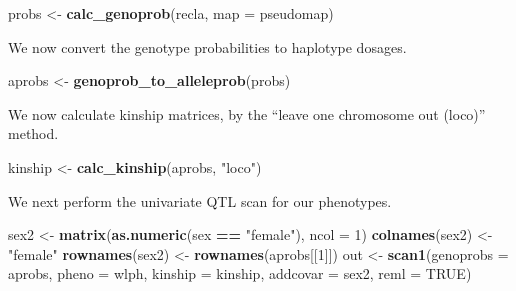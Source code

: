 \documentclass[oneside]{book}
\newenvironment{Shaded}{\begin{snugshade}}{\end{snugshade}}
\newcommand{\CommentTok}[1]{\textcolor[rgb]{0.56,0.35,0.01}{\textit{#1}}}
\newcommand{\DataTypeTok}[1]{\textcolor[rgb]{0.13,0.29,0.53}{#1}}
\newcommand{\DecValTok}[1]{\textcolor[rgb]{0.00,0.00,0.81}{#1}}
\newcommand{\KeywordTok}[1]{\textcolor[rgb]{0.13,0.29,0.53}{\textbf{#1}}}
\newcommand{\NormalTok}[1]{#1}
\newcommand{\OperatorTok}[1]{\textcolor[rgb]{0.81,0.36,0.00}{\textbf{#1}}}
\newcommand{\OtherTok}[1]{\textcolor[rgb]{0.56,0.35,0.01}{#1}}
\newcommand{\StringTok}[1]{\textcolor[rgb]{0.31,0.60,0.02}{#1}}
\begin{document}
\begin{Shaded}
\begin{Highlighting}[]
\NormalTok{probs <-}\StringTok{ }\KeywordTok{calc_genoprob}\NormalTok{(recla, }\DataTypeTok{map =}\NormalTok{ pseudomap)}
\end{Highlighting}
\end{Shaded}

We now convert the genotype probabilities to haplotype dosages.

\begin{Shaded}
\begin{Highlighting}[]
\NormalTok{aprobs <-}\StringTok{ }\KeywordTok{genoprob_to_alleleprob}\NormalTok{(probs)}
\end{Highlighting}
\end{Shaded}

We now calculate kinship matrices, by the ``leave one chromosome out
(loco)'' method.

\begin{Shaded}
\begin{Highlighting}[]
\NormalTok{kinship <-}\StringTok{ }\KeywordTok{calc_kinship}\NormalTok{(aprobs, }\StringTok{"loco"}\NormalTok{)}
\end{Highlighting}
\end{Shaded}

\begin{Shaded}
\end{Shaded}

We next perform the univariate QTL scan for our phenotypes.

\begin{Shaded}
\begin{Highlighting}[]
\NormalTok{sex2 <-}\StringTok{ }\KeywordTok{matrix}\NormalTok{(}\KeywordTok{as.numeric}\NormalTok{(sex }\OperatorTok{==}\StringTok{ "female"}\NormalTok{), }\DataTypeTok{ncol =} \DecValTok{1}\NormalTok{)}
\KeywordTok{colnames}\NormalTok{(sex2) <-}\StringTok{ "female"}
\KeywordTok{rownames}\NormalTok{(sex2) <-}\StringTok{ }\KeywordTok{rownames}\NormalTok{(aprobs[[}\DecValTok{1}\NormalTok{]])}
\NormalTok{out <-}\StringTok{ }\KeywordTok{scan1}\NormalTok{(}\DataTypeTok{genoprobs =}\NormalTok{ aprobs, }\DataTypeTok{pheno =}\NormalTok{ wlph, }\DataTypeTok{kinship =}\NormalTok{ kinship, }\DataTypeTok{addcovar =}\NormalTok{ sex2, }\DataTypeTok{reml =} \OtherTok{TRUE}\NormalTok{)}
\end{Highlighting}
\end{Shaded}
\end{document}
